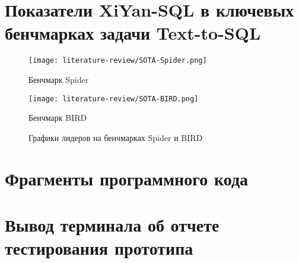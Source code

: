 \chapter{Показатели XiYan-SQL в ключевых бенчмарках задачи Text-to-SQL}\label{appendix-A}

\begin{figure}[h]
	\centering
	\begin{subcaptiongroup}
		\texttt{[image: literature-review/SOTA-Spider.png]}
		\caption{Бенчмарк Spider}
		\label{fig:SOTA-Spider}
		\texttt{[image: literature-review/SOTA-BIRD.png]}
		\caption{Бенчмарк BIRD}
		\label{fig:SOTA-Bird}
	\end{subcaptiongroup}
	\captionsetup{subrefformat=parens}
	\caption{Графики лидеров на бенчмарках Spider и BIRD}
	\label{fig:SOTA-Spider-Bird}
\end{figure}

\makeatletter
\let\clearpage\oldclearpage
\makeatother

\clearpage

\chapter{Фрагменты программного кода}\label{appendix-B}











\clearpage

\chapter{Вывод терминала об отчете тестирования прототипа}\label{appendix-C}

